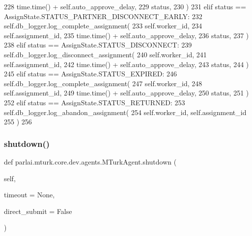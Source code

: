 \begin{DoxyCode}
228                     time.time() + self.auto\_approve\_delay,
229                     status,
230                 )
231             \textcolor{keywordflow}{elif} status == AssignState.STATUS\_PARTNER\_DISCONNECT\_EARLY:
232                 self.db\_logger.log\_complete\_assignment(
233                     self.worker\_id,
234                     self.assignment\_id,
235                     time.time() + self.auto\_approve\_delay,
236                     status,
237                 )
238             \textcolor{keywordflow}{elif} status == AssignState.STATUS\_DISCONNECT:
239                 self.db\_logger.log\_disconnect\_assignment(
240                     self.worker\_id,
241                     self.assignment\_id,
242                     time.time() + self.auto\_approve\_delay,
243                     status,
244                 )
245             \textcolor{keywordflow}{elif} status == AssignState.STATUS\_EXPIRED:
246                 self.db\_logger.log\_complete\_assignment(
247                     self.worker\_id,
248                     self.assignment\_id,
249                     time.time() + self.auto\_approve\_delay,
250                     status,
251                 )
252             \textcolor{keywordflow}{elif} status == AssignState.STATUS\_RETURNED:
253                 self.db\_logger.log\_abandon\_assignment(
254                     self.worker\_id, self.assignment\_id
255                 )
256 
\end{DoxyCode}
\mbox{\label{classparlai_1_1mturk_1_1core_1_1dev_1_1agents_1_1MTurkAgent_a2b0576f33db15042a1520f6c9b4157c2}} 
\subsubsection{\texorpdfstring{shutdown()}{shutdown()}}
{\footnotesize\ttfamily def parlai.\+mturk.\+core.\+dev.\+agents.\+M\+Turk\+Agent.\+shutdown (\begin{DoxyParamCaption}\item[{}]{self,  }\item[{}]{timeout = {\ttfamily None},  }\item[{}]{direct\+\_\+submit = {\ttfamily False} }\end{DoxyParamCaption})}

